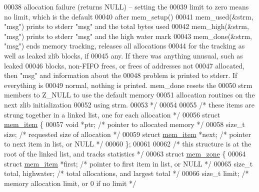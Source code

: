 \begin{DoxyCode}
00038 \textcolor{comment}{                            allocation failure (returns NULL) -- setting the}
00039 \textcolor{comment}{                            limit to zero means no limit, which is the default}
00040 \textcolor{comment}{                            after mem\_setup()}
00041 \textcolor{comment}{   mem\_used(&strm, "msg")   prints to stderr "msg" and the total bytes used}
00042 \textcolor{comment}{   mem\_high(&strm, "msg")   prints to stderr "msg" and the high water mark}
00043 \textcolor{comment}{   mem\_done(&strm, "msg")   ends memory tracking, releases all allocations}
00044 \textcolor{comment}{                            for the tracking as well as leaked zlib blocks, if}
00045 \textcolor{comment}{                            any.  If there was anything unusual, such as leaked}
00046 \textcolor{comment}{                            blocks, non-FIFO frees, or frees of addresses not}
00047 \textcolor{comment}{                            allocated, then "msg" and information about the}
00048 \textcolor{comment}{                            problem is printed to stderr.  If everything is}
00049 \textcolor{comment}{                            normal, nothing is printed. mem\_done resets the}
00050 \textcolor{comment}{                            strm members to Z\_NULL to use the default memory}
00051 \textcolor{comment}{                            allocation routines on the next zlib initialization}
00052 \textcolor{comment}{                            using strm.}
00053 \textcolor{comment}{ */}
00054 
00055 \textcolor{comment}{/* these items are strung together in a linked list, one for each allocation */}
00056 \textcolor{keyword}{struct }\hyperlink{structmem__item}{mem\_item} \{
00057     \textcolor{keywordtype}{void} *ptr;                  \textcolor{comment}{/* pointer to allocated memory */}
00058     \textcolor{keywordtype}{size\_t} size;                \textcolor{comment}{/* requested size of allocation */}
00059     \textcolor{keyword}{struct }\hyperlink{structmem__item}{mem\_item} *next;      \textcolor{comment}{/* pointer to next item in list, or NULL */}
00060 \};
00061 
00062 \textcolor{comment}{/* this structure is at the root of the linked list, and tracks statistics */}
00063 \textcolor{keyword}{struct }\hyperlink{structmem__zone}{mem\_zone} \{
00064     \textcolor{keyword}{struct }\hyperlink{structmem__item}{mem\_item} *first;     \textcolor{comment}{/* pointer to first item in list, or NULL */}
00065     \textcolor{keywordtype}{size\_t} total, highwater;    \textcolor{comment}{/* total allocations, and largest total */}
00066     \textcolor{keywordtype}{size\_t} limit;               \textcolor{comment}{/* memory allocation limit, or 0 if no limit */}

\end{DoxyCode}
